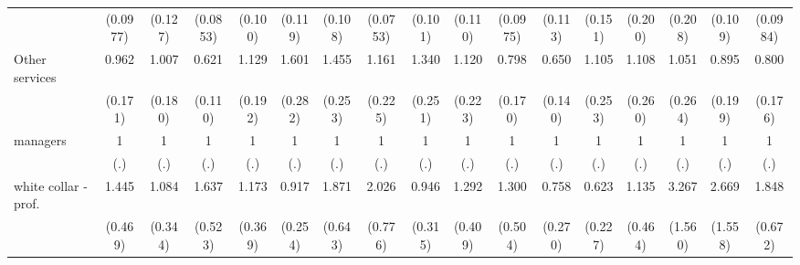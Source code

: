 {\begin{tabular}{l*{16}{c}}
                    &    (0.0977)         &     (0.127)         &    (0.0853)         &     (0.100)         &     (0.119)         &     (0.108)         &    (0.0753)         &     (0.101)         &     (0.110)         &    (0.0975)         &     (0.113)         &     (0.151)         &     (0.200)         &     (0.208)         &     (0.109)         &    (0.0984)         \\
[1em]
Other services      &       0.962         &       1.007         &       0.621\sym{**} &       1.129         &       1.601\sym{**} &       1.455\sym{*}  &       1.161         &       1.340         &       1.120         &       0.798         &       0.650\sym{*}  &       1.105         &       1.108         &       1.051         &       0.895         &       0.800         \\
                    &     (0.171)         &     (0.180)         &     (0.110)         &     (0.192)         &     (0.282)         &     (0.253)         &     (0.225)         &     (0.251)         &     (0.223)         &     (0.170)         &     (0.140)         &     (0.253)         &     (0.260)         &     (0.264)         &     (0.199)         &     (0.176)         \\
[1em]
managers            &           1         &           1         &           1         &           1         &           1         &           1         &           1         &           1         &           1         &           1         &           1         &           1         &           1         &           1         &           1         &           1         \\
                    &         (.)         &         (.)         &         (.)         &         (.)         &         (.)         &         (.)         &         (.)         &         (.)         &         (.)         &         (.)         &         (.)         &         (.)         &         (.)         &         (.)         &         (.)         &         (.)         \\
[1em]
white collar - prof.&       1.445         &       1.084         &       1.637         &       1.173         &       0.917         &       1.871         &       2.026         &       0.946         &       1.292         &       1.300         &       0.758         &       0.623         &       1.135         &       3.267\sym{*}  &       2.669         &       1.848         \\
                    &     (0.469)         &     (0.344)         &     (0.523)         &     (0.369)         &     (0.254)         &     (0.643)         &     (0.776)         &     (0.315)         &     (0.409)         &     (0.504)         &     (0.270)         &     (0.227)         &     (0.464)         &     (1.560)         &     (1.558)         &     (0.672)         \\

\end{tabular}}

